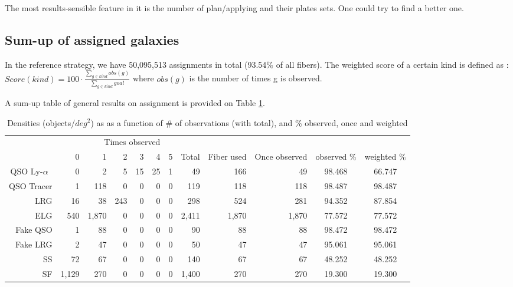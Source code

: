 \documentclass{extarticle}
\def\lya{Ly-$\alpha$\ }
\def\sqd{$deg^{2}$}
\begin{document}
The most results-sensible feature in it is the number of plan/applying and their plates sets. One could try to find a better one.


\subsection{Sum-up of assigned galaxies}
In the reference strategy, we have 50,095,513 assignments in total (93.54\% of all fibers). The weighted score of a certain kind is defined as : 
\vspace{1\baselineskip}
$Score(kind) = 100\cdot \frac{\sum\nolimits_{g \in kind} obs(g)}{\sum\nolimits_{g \in kind} goal}$ where $obs(g)$ is the number of times g is observed.

A sum-up table of general results on assignment is provided on Table \ref{res}.


\begin{table}[H]\begin{center}
\begin{tabular}{rrrrrrrrrrcc}
\hline
\multicolumn{6}{r}{Times observed} \\
	~ &           0 &     1 &  2 & 3 & 4 & 5 &  Total & Fiber used & Once observed & observed $\%$ & weighted $\%$ \\ \hline
    QSO \lya  &     0 &     2 &   5 & 15 & 25 & 1 &    49 &   166 &    49 & 98.468 & 66.747 \\ 
  QSO Tracer   &     1 &   118 &   0 &  0 &  0 & 0 &   119 &   118 &   118 & 98.487 & 98.487 \\ 
        LRG   &    16 &    38 & 243 &  0 &  0 & 0 &   298 &   524 &   281 & 94.352 & 87.854 \\ 
        ELG   &   540 & 1,870 &   0 &  0 &  0 & 0 & 2,411 & 1,870 & 1,870 & 77.572 & 77.572 \\ 
    Fake QSO   &     1 &    88 &   0 &  0 &  0 & 0 &    90 &    88 &    88 & 98.472 & 98.472 \\ 
    Fake LRG   &     2 &    47 &   0 &  0 &  0 & 0 &    50 &    47 &    47 & 95.061 & 95.061 \\ 
         SS   &    72 &    67 &   0 &  0 &  0 & 0 &   140 &    67 &    67 & 48.252 & 48.252 \\ 
         SF   & 1,129 &   270 &   0 &  0 &  0 & 0 & 1,400 &   270 &   270 & 19.300 & 19.300 \\ 
\hline
\end{tabular}
\caption{Densities (objects/\sqd) as as a function of \# of observations (with total), and \% observed, once and weighted}\label{res}
\end{center}\end{table}
\end{document}
